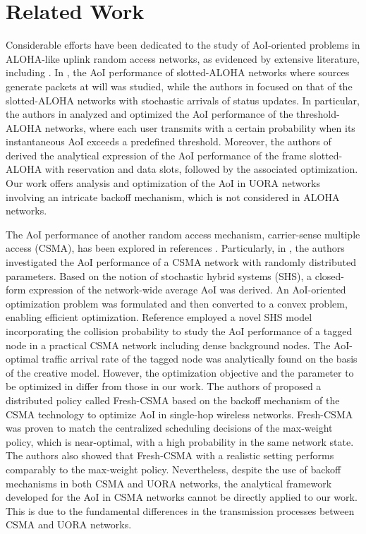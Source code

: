 \section{Related Work}
Considerable efforts have been dedicated to the study of AoI-oriented problems in ALOHA-like uplink random access networks, as evidenced by extensive literature, including \cite{9162973, 9785624, 9377549, chan2023lowpower, 8445979, 9791264, 8764468, 10138556, 10229041}. 
In \cite{9162973,9785624,9377549,8445979}, the AoI performance of slotted-ALOHA networks where sources generate packets at will was studied, while the authors in \cite{8445979,9791264,8764468,10229041} focused on that of the slotted-ALOHA networks with stochastic arrivals of status updates.
In particular, the authors in \cite{9162973,9785624,9377549} analyzed and optimized the AoI performance of the threshold-ALOHA networks, where each user transmits with a certain probability when its instantaneous AoI exceeds a predefined threshold. 
Moreover, the authors of \cite{10138556,chan2023lowpower} derived the analytical expression of the AoI performance of the frame slotted-ALOHA with reservation and data slots, followed by the associated optimization.
Our work offers analysis and optimization of the AoI in UORA networks involving an intricate backoff mechanism, which is not considered in ALOHA networks.

The AoI performance of another random access mechanism, carrier-sense multiple access (CSMA), has been explored in references \cite{5984917, 8493069, 10.1109/TNET.2020.2971350,10621330,10323421}. 
Particularly, in \cite{10.1109/TNET.2020.2971350}, the authors investigated the AoI performance of a CSMA network with randomly distributed parameters.
Based on the notion of stochastic hybrid systems (SHS), a closed-form expression of the network-wide average AoI was derived.
An AoI-oriented optimization problem was formulated and then converted to a convex problem, enabling efficient optimization.
Reference \cite{10621330} employed a novel SHS model incorporating the collision probability to study the AoI performance of a tagged node in a practical CSMA network including dense background nodes.
The AoI-optimal traffic arrival rate of the tagged node was analytically found on the basis of the creative model.
However, the optimization objective and the parameter to be optimized in \cite{10621330} differ from those in our work.
The authors of \cite{10323421} proposed a distributed policy called Fresh-CSMA based on the backoff mechanism of the CSMA technology to optimize AoI in single-hop wireless networks.
Fresh-CSMA was proven to match the centralized scheduling decisions of the max-weight policy, which is near-optimal, with a high probability in the same network state.
The authors also showed that Fresh-CSMA with a realistic setting performs comparably to the max-weight policy.
Nevertheless, despite the use of backoff mechanisms in both CSMA and UORA networks, the analytical framework developed for the AoI in CSMA networks cannot be directly applied to our work. This is due to the fundamental differences in the transmission processes between CSMA and UORA networks.

